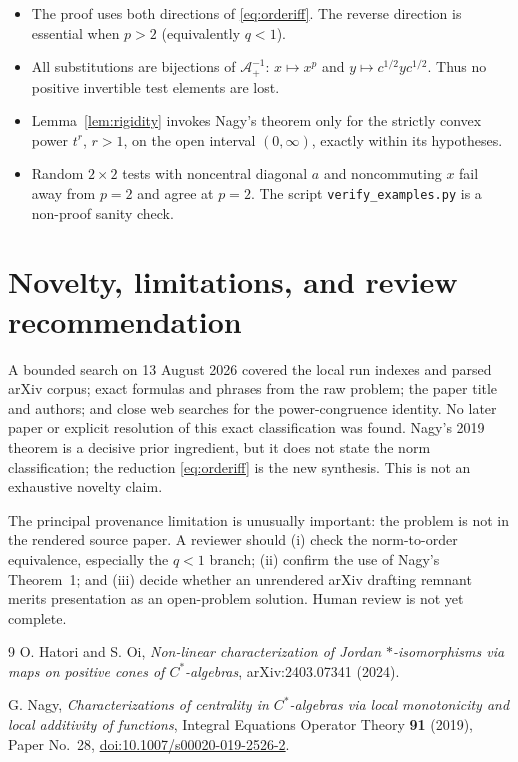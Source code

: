 \documentclass[11pt]{article}
\newcommand{\A}{\mathcal A}
\newcommand{\posinv}{\A_{+}^{-1}}
\begin{document}
\begin{itemize}
\item The proof uses both directions of \eqref{eq:orderiff}. The reverse
direction is essential when $p>2$ (equivalently $q<1$).
\item All substitutions are bijections of $\posinv$: $x\mapsto x^p$ and
$y\mapsto c^{1/2}yc^{1/2}$. Thus no positive invertible test elements are
lost.
\item Lemma~\ref{lem:rigidity} invokes Nagy's theorem only for the strictly
convex power $t^r$, $r>1$, on the open interval $(0,\infty)$, exactly within
its hypotheses.
\item Random $2\times2$ tests with noncentral diagonal $a$ and noncommuting
$x$ fail away from $p=2$ and agree at $p=2$. The script
\texttt{verify\_examples.py} is a non-proof sanity check.
\end{itemize}

\section{Novelty, limitations, and review recommendation}

A bounded search on 13 August 2026 covered the local run indexes and parsed
arXiv corpus; exact formulas and phrases from the raw problem; the paper
title and authors; and close web searches for the power-congruence identity.
No later paper or explicit resolution of this exact classification was found.
Nagy's 2019 theorem is a decisive prior ingredient, but it does not state the
norm classification; the reduction \eqref{eq:orderiff} is the new synthesis.
This is not an exhaustive novelty claim.

The principal provenance limitation is unusually important: the problem is
not in the rendered source paper. A reviewer should (i) check the
norm-to-order equivalence, especially the $q<1$ branch; (ii) confirm the use
of Nagy's Theorem~1; and (iii) decide whether an unrendered arXiv drafting
remnant merits presentation as an open-problem solution. Human review is not
yet complete.

\begin{thebibliography}{9}
O. Hatori and S. Oi,
\emph{Non-linear characterization of Jordan $*$-isomorphisms via maps on
positive cones of $C^*$-algebras}, arXiv:2403.07341 (2024).

G. Nagy,
\emph{Characterizations of centrality in $C^*$-algebras via local
monotonicity and local additivity of functions},
Integral Equations Operator Theory \textbf{91} (2019), Paper No.~28,
\href{https://doi.org/10.1007/s00020-019-2526-2}{doi:10.1007/s00020-019-2526-2}.
\end{thebibliography}
\end{document}
